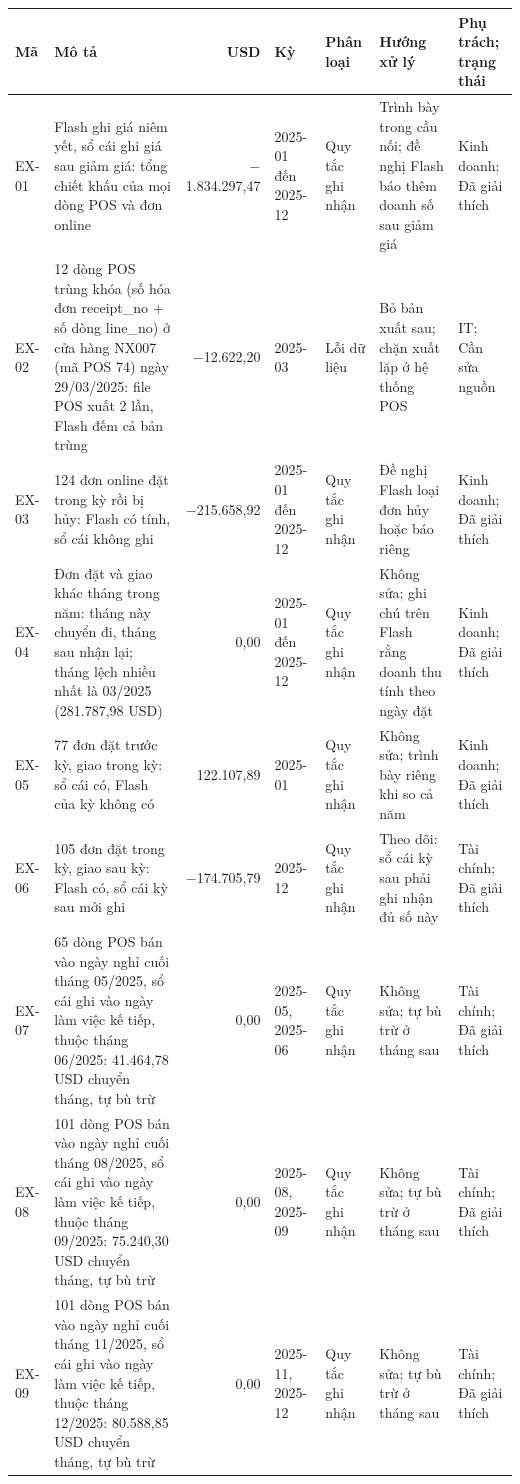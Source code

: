 {\scriptsize
\begin{longtable}{@{}L{0.85cm} L{4.05cm} r L{1.6cm} L{1.6cm} L{2.85cm} L{1.7cm}@{}}
\toprule
Mã & Mô tả & USD & Kỳ & Phân loại & Hướng xử lý & Phụ trách; trạng thái \\
\midrule
\endhead
EX-01 & Flash ghi giá niêm yết, sổ cái ghi giá sau giảm giá: tổng chiết khấu của mọi dòng POS và đơn online & $-$1.834.297,47 & 2025-01 đến 2025-12 & Quy tắc ghi nhận & Trình bày trong cầu nối; đề nghị Flash báo thêm doanh số sau giảm giá & Kinh doanh; Đã giải thích \\
EX-02 & 12 dòng POS trùng khóa (số hóa đơn receipt\_no + số dòng line\_no) ở cửa hàng NX007 (mã POS 74) ngày 29/03/2025: file POS xuất 2 lần, Flash đếm cả bản trùng & $-$12.622,20 & 2025-03 & Lỗi dữ liệu & Bỏ bản xuất sau; chặn xuất lặp ở hệ thống POS & IT; Cần sửa nguồn \\
EX-03 & 124 đơn online đặt trong kỳ rồi bị hủy: Flash có tính, sổ cái không ghi & $-$215.658,92 & 2025-01 đến 2025-12 & Quy tắc ghi nhận & Đề nghị Flash loại đơn hủy hoặc báo riêng & Kinh doanh; Đã giải thích \\
EX-04 & Đơn đặt và giao khác tháng trong năm: tháng này chuyển đi, tháng sau nhận lại; tháng lệch nhiều nhất là 03/2025 (281.787,98 USD) & 0,00 & 2025-01 đến 2025-12 & Quy tắc ghi nhận & Không sửa; ghi chú trên Flash rằng doanh thu tính theo ngày đặt & Kinh doanh; Đã giải thích \\
EX-05 & 77 đơn đặt trước kỳ, giao trong kỳ: sổ cái có, Flash của kỳ không có & 122.107,89 & 2025-01 & Quy tắc ghi nhận & Không sửa; trình bày riêng khi so cả năm & Kinh doanh; Đã giải thích \\
EX-06 & 105 đơn đặt trong kỳ, giao sau kỳ: Flash có, sổ cái kỳ sau mới ghi & $-$174.705,79 & 2025-12 & Quy tắc ghi nhận & Theo dõi: sổ cái kỳ sau phải ghi nhận đủ số này & Tài chính; Đã giải thích \\
EX-07 & 65 dòng POS bán vào ngày nghỉ cuối tháng 05/2025, sổ cái ghi vào ngày làm việc kế tiếp, thuộc tháng 06/2025: 41.464,78 USD chuyển tháng, tự bù trừ & 0,00 & 2025-05, 2025-06 & Quy tắc ghi nhận & Không sửa; tự bù trừ ở tháng sau & Tài chính; Đã giải thích \\
EX-08 & 101 dòng POS bán vào ngày nghỉ cuối tháng 08/2025, sổ cái ghi vào ngày làm việc kế tiếp, thuộc tháng 09/2025: 75.240,30 USD chuyển tháng, tự bù trừ & 0,00 & 2025-08, 2025-09 & Quy tắc ghi nhận & Không sửa; tự bù trừ ở tháng sau & Tài chính; Đã giải thích \\
EX-09 & 101 dòng POS bán vào ngày nghỉ cuối tháng 11/2025, sổ cái ghi vào ngày làm việc kế tiếp, thuộc tháng 12/2025: 80.588,85 USD chuyển tháng, tự bù trừ & 0,00 & 2025-11, 2025-12 & Quy tắc ghi nhận & Không sửa; tự bù trừ ở tháng sau & Tài chính; Đã giải thích \\

\end{longtable}}
